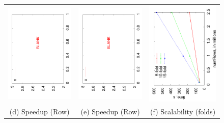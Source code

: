 \documentclass{vldb}
\begin{document}
\begin{figure}
\begin{tabular}{ccc}
\includegraphics[angle=-90,width=2.3in]{blank.pdf} &
\hspace*{-0.2in}
\includegraphics[angle=-90,width=2.3in]{blank.pdf} &
\hspace*{-0.2in}
\includegraphics[angle=-90,width=2.3in]{kfold.pdf} \\
(d) Speedup (Row) & (e) Speedup (Row) & (f) Scalability (folds) \\



\end{tabular}
\end{figure}
\end{document}
